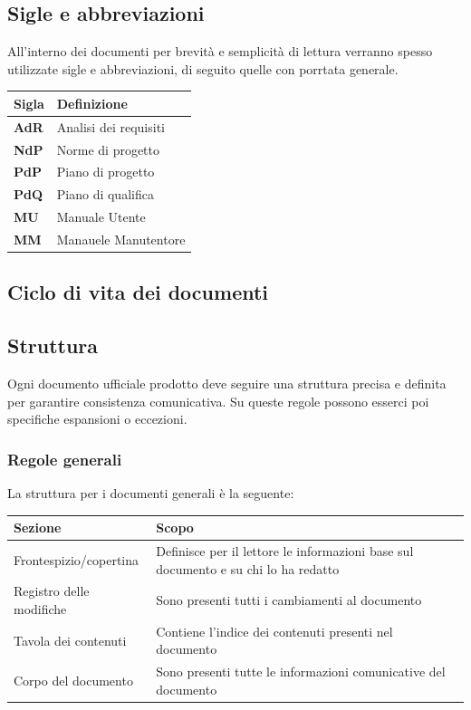 \subsection{Sigle e abbreviazioni}

All'interno dei documenti per brevità e semplicità di lettura verranno spesso utilizzate sigle e abbreviazioni, di seguito quelle con porrtata generale.

\begin{center}
    \begin{tabularx}{\linewidth}{l | X }            
        \textbf{Sigla} & \textbf{Definizione}\\
        \hline
        \textbf{AdR} & Analisi dei requisiti\\
        \textbf{NdP}& Norme di progetto\\
        \textbf{PdP}& Piano di progetto\\
        \textbf{PdQ}& Piano di qualifica\\
        \textbf{MU}& Manuale Utente\\
        \textbf{MM}& Manauele Manutentore\\
    \end{tabularx}
\end{center}

\subsection{Ciclo di vita dei documenti}

\subsection{Struttura}

Ogni documento ufficiale prodotto deve seguire una struttura precisa e definita per garantire consistenza comunicativa. Su queste regole possono esserci poi specifiche espansioni o eccezioni.

\subsubsection{Regole generali}

La struttura per i documenti generali è la seguente:

\begin{center}
    \begin{tabularx}{\linewidth}{l | X }            
        \textbf{Sezione} & \textbf{Scopo}\\
        \hline
        Frontespizio/copertina & Definisce per il lettore le informazioni base sul documento e su chi lo ha redatto\\
        Registro delle modifiche & Sono presenti tutti i cambiamenti al documento\\
        Tavola dei contenuti & Contiene l'indice dei contenuti presenti nel documento \\
        Corpo del documento & Sono presenti tutte le informazioni comunicative del documento\\
    \end{tabularx}
\end{center}

